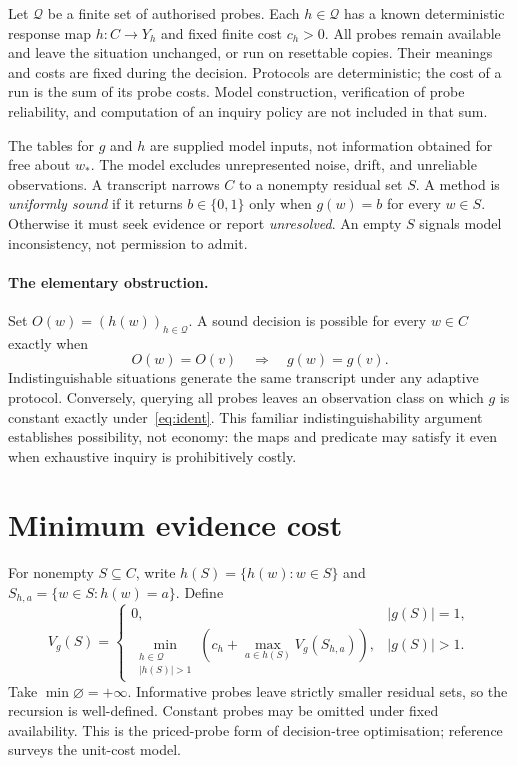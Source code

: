 \documentclass[11pt,letterpaper]{article}
\begin{document}
Let $\mathcal Q$ be a finite set of authorised probes. Each $h\in\mathcal Q$ has a known deterministic response map $h:C\to Y_h$ and fixed finite cost $c_h>0$. All probes remain available and leave the situation unchanged, or run on resettable copies. Their meanings and costs are fixed during the decision. Protocols are deterministic; the cost of a run is the sum of its probe costs. Model construction, verification of probe reliability, and computation of an inquiry policy are not included in that sum.

The tables for $g$ and $h$ are supplied model inputs, not information obtained for free about $w_*$. The model excludes unrepresented noise, drift, and unreliable observations. A transcript narrows $C$ to a nonempty residual set $S$. A method is \emph{uniformly sound} if it returns $b\in\{0,1\}$ only when $g(w)=b$ for every $w\in S$. Otherwise it must seek evidence or report \emph{unresolved}. An empty $S$ signals model inconsistency, not permission to admit.

\paragraph{The elementary obstruction.}
Set $O(w)=(h(w))_{h\in\mathcal Q}$. A sound decision is possible for every $w\in C$ exactly when
\begin{equation}
 O(w)=O(v)\quad\Longrightarrow\quad g(w)=g(v).
 \label{eq:ident}
\end{equation}
Indistinguishable situations generate the same transcript under any adaptive protocol. Conversely, querying all probes leaves an observation class on which $g$ is constant exactly under~\eqref{eq:ident}. This familiar indistinguishability argument~\cite{knowledge,trees} establishes possibility, not economy: the maps and predicate may satisfy it even when exhaustive inquiry is prohibitively costly.

\section{Minimum evidence cost}
For nonempty $S\subseteq C$, write $h(S)=\{h(w):w\in S\}$ and
$S_{h,a}=\{w\in S:h(w)=a\}$. Define
\begin{equation}
 V_g(S)=
 \begin{cases}
 0, & |g(S)|=1,\\[3pt]
 \displaystyle\min_{\substack{h\in\mathcal Q\\|h(S)|>1}}
 \left(c_h+\max_{a\in h(S)}V_g(S_{h,a})\right), & |g(S)|>1.
 \end{cases}
 \label{eq:dp}
\end{equation}
Take $\min\varnothing=+\infty$. Informative probes leave strictly smaller residual sets, so the recursion is well-defined. Constant probes may be omitted under fixed availability. This is the priced-probe form of decision-tree optimisation; reference~\cite{trees} surveys the unit-cost model.
\end{document}
